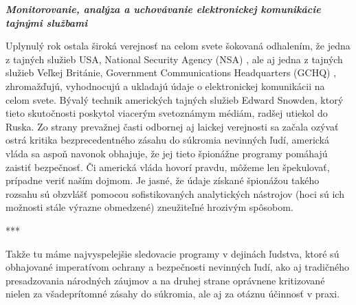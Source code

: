 \documentclass{article}
\begin{document}
\pagebreak
\begin{center}
\Huge
\textbf{\textit{Monitorovanie, analýza a uchovávanie elektronickej komunikácie tajnými službami}}
\normalsize
\end{center}

\bigskip

\setlength{\parindent}{1,25cm}

Uplynulý rok ostala široká verejnosť na celom svete šokovaná odhalením, že jedna z tajných služieb USA, National Security Agency (NSA) \cite{nsa}, ale aj jedna z tajných služieb Veľkej Británie, Government Communications Headquarters (GCHQ) \cite{gchq}, zhromažďujú, vyhodnocujú a ukladajú údaje o elektronickej komunikácii na celom svete. Bývalý technik amerických tajných služieb Edward Snowden, ktorý tieto skutočnosti poskytol viacerým svetoznámym médiám, radšej utiekol do Ruska. \cite{techsme1,sme1} Zo strany prevažnej časti odbornej aj laickej verejnosti sa začala ozývať ostrá kritika bezprecedentného zásahu do súkromia nevinných ľudí, americká vláda sa aspoň navonok obhajuje, že jej tieto špionážne programy pomáhajú zaistiť bezpečnosť. Či americká vláda hovorí pravdu, môžeme len špekulovať, prípadne veriť naším dojmom. Je jasné, že údaje získané špionážou takého rozsahu sú obzvlášť pomocou sofistikovaných analytických nástrojov (hoci sú ich možnosti stále výrazne obmedzené) zneužiteľné hrozivým spôsobom.

\begin{center}
***
\end{center}

Takže tu máme najvyspelejšie sledovacie programy v dejinách ľudstva, ktoré sú obhajované imperatívom ochrany a bezpečnosti nevinných ľudí, ako aj tradičného presadzovania národných záujmov a na druhej strane oprávnene kritizované nielen za všadeprítomné zásahy do súkromia, ale aj za otáznu účinnosť v praxi.

\smallskip
\end{document}
